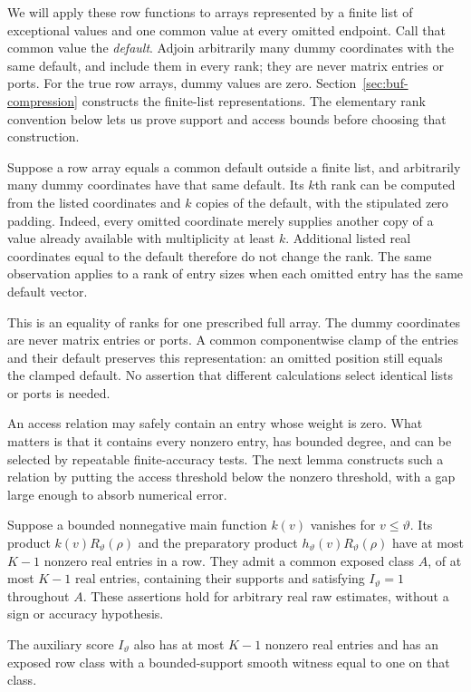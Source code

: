 We will apply these row functions to arrays represented by a finite list
of exceptional values and one common value at every omitted endpoint.
Call that common value the \emph{default}.  Adjoin arbitrarily many dummy
coordinates with the same default, and include them in every rank; they
are never matrix entries or ports.  For the true row arrays, dummy values
are zero.  Section~\ref{sec:buf-compression} constructs the finite-list
representations.  The elementary rank convention below lets us prove
support and access bounds before choosing that construction.

\begin{remark}
\label{rem:atom-finite-ranks}
Suppose a row array equals a common default outside a finite list,
and arbitrarily many dummy coordinates have that same default.  Its
$k$th rank can be computed from the listed coordinates and $k$ copies of
the default, with the stipulated zero padding.  Indeed, every omitted
coordinate merely supplies another copy of a value already available
with multiplicity at least $k$.  Additional listed real coordinates
equal to the default therefore do not change the rank.  The same
observation applies to a rank of entry sizes when each omitted entry
has the same default vector.

This is an equality of ranks for one prescribed full array.  The dummy
coordinates are never matrix entries or ports.  A common componentwise
clamp of the entries and their default preserves this representation:
an omitted position still equals the clamped default.  No assertion
that different calculations select identical lists or ports is needed.
\end{remark}

An access relation may safely contain an entry whose weight is zero. What matters is that it contains every nonzero entry, has bounded degree, and can be selected by repeatable finite-accuracy tests. The next lemma constructs such a relation by putting the access threshold below the nonzero threshold, with a gap large enough to absorb numerical error.

\begin{lemma}
\label{lem:atom-margins}
Suppose a bounded nonnegative main function $k(v)$ vanishes for
$v\le\vartheta$.  Its product $k(v)R_{\vartheta}(\rho)$ and the
preparatory product $h_{\vartheta}(v)R_{\vartheta}(\rho)$ have at most
$K-1$ nonzero real entries in a row.  They admit a common exposed class
$A$, of at most $K-1$ real entries, containing their supports and satisfying
$I_{\vartheta}=1$ throughout $A$.  These assertions hold for arbitrary
real raw estimates, without a sign or accuracy hypothesis.

The auxiliary score $I_{\vartheta}$ also has at most $K-1$ nonzero real
entries and has an exposed row class with a bounded-support smooth
witness equal to one on that class.
\end{lemma}

